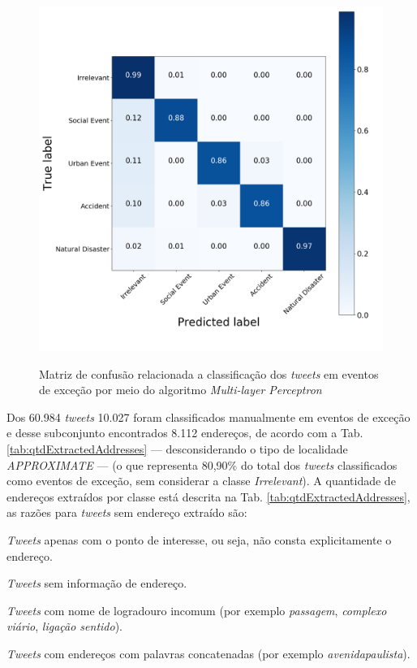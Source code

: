 \documentclass[
	12pt,				%
	oneside,			%
	a4paper,			%
	english,			%
	brazil				%
	]{abntex2ppgsi}
\begin{document}
{{\begin{figure}[!htb]
	\centering
 	  \caption{Matriz de confusão relacionada a classificação dos \textit{tweets} em eventos de exceção por meio do algoritmo \textit{Multi-layer Perceptron}}
		\includegraphics[width=1\linewidth]{images/confusion_matrix_mlp.png}
	\label{fig:confusion_matrix_mlp}
\end{figure}

Dos 60.984 \textit{tweets} 10.027 foram classificados manualmente em eventos de exceção e desse subconjunto encontrados 8.112 endereços, de acordo com a Tab. \ref{tab:qtdExtractedAddresses} --- desconsiderando o tipo de localidade \textit{APPROXIMATE} --- (o que representa 80,90\% do total dos \textit{tweets} classificados como eventos de exceção, sem considerar a classe \textit{Irrelevant}). A quantidade de endereços extraídos por classe está descrita na Tab. \ref{tab:qtdExtractedAddresses}, as razões para \textit {tweets} sem endereço extraído são:

\begin{enumerate*}
\item \textit{Tweets} apenas com o ponto de interesse, ou seja, não consta explicitamente o endereço.
\item \textit{Tweets} sem informação de endereço.
\item \textit{Tweets} com nome de logradouro incomum (por exemplo \emph{passagem}, \emph{complexo viário}, \emph{ligação sentido}).
\item \textit{Tweets} com endereços com palavras concatenadas (por exemplo \emph{avenidapaulista}).
\end{enumerate*}

}}
\end{document}
